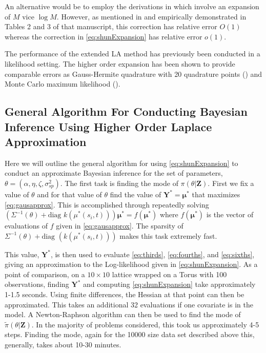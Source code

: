 \documentclass[11pt]{isuthesis}
\begin{document}
	
	An alternative would be to employ the derivations in \cite{raudenbush2000maximum} which involve an expansion of $M$ vice $\log M$.  However, as mentioned in \cite{shun1995laplace} and empirically demonstrated in Tables 2 and 3 of that manuscript, this correction has relative error $O(1)$ whereas the correction in \eqref{eq:shunExpansion} has relative error $o(1)$.
	
	The performance of the extended LA method has previously been conducted in a likelihood setting.  The higher order expansion has been shown to provide comparable errors as Gauss-Hermite quadrature with 20 quadrature points (\cite{raudenbush2000maximum}) and Monte Carlo maximum likelihood (\cite{evangelou2011estimation}).   
	
	\subsection{General Algorithm For Conducting Bayesian Inference Using Higher Order Laplace Approximation}
	
	Here we will outline the general algorithm for using \eqref{eq:shunExpansion} to conduct an approximate Bayesian inference for the set of parameters, $\theta=\left(\alpha,\eta,\zeta,\sigma_{sp}^2\right)$.  The first task is finding the mode of $\pi(\theta|\boldsymbol{Z})$.  First we fix a value of $\theta$ and for that value of $\theta$ find the value of $\boldsymbol{Y}^*=\boldsymbol{\mu}^*$ that maximizes \eqref{eq:gausapprox}.  This is accomplished through repeatedly solving $\left(\Sigma^{-1}(\theta)+\text{diag }k(\mu^*(s_i,t))\right)\boldsymbol{\mu}^*=f(\boldsymbol{\mu}^*)$ where $f(\boldsymbol{\mu^*})$ is the vector of evaluations of $f$ given in \eqref{eq:gausapprox}.  The sparsity of $\Sigma^{-1}(\theta)+\text{diag }(k(\mu^*(s_i,t)))$ makes this task extremely fast.
	
	This value, $\boldsymbol{Y}^*$, is then used to evaluate \eqref{eq:thirds}, \eqref{eq:fourths}, and \eqref{eq:sixths}, giving an approximation to the Log-likelihood given in \eqref{eq:shunExpansion}.  As a point of comparison, on a $10 \times 10$ lattice wrapped on a Torus with 100 observations, finding $\boldsymbol{Y}^*$ and computing \eqref{eq:shunExpansion} take approximately 1-1.5 seconds.  Using finite differences, the Hessian at that point can then be approximated.  This takes an additional 32 evaluations if one covariate is in the model.  A Newton-Raphson algorithm can then be used to find the mode of $\tilde{\pi}(\theta|\boldsymbol{Z})$.  In the majority of problems considered, this took us approximately 4-5 steps.  Finding the mode, again for the 10000 size data set described above this, generally, takes about 10-30 minutes.
	
\end{document}
